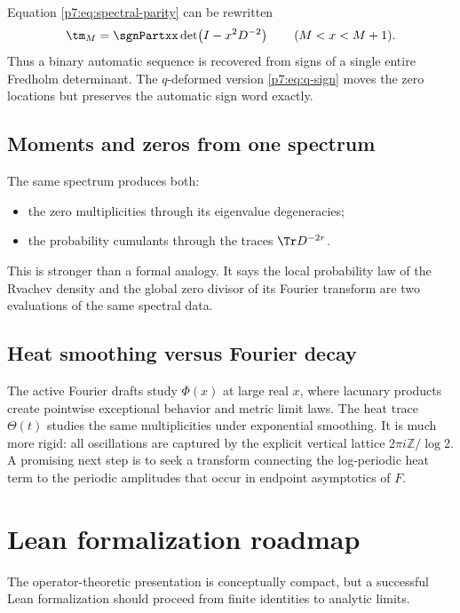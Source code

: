 \documentclass[11pt]{article}
\numberwithin{equation}{section}
\theoremstyle{definition}
\theoremstyle{remark}
\newcommand{\Z}{\mathbb Z}
\begin{document}
Equation \cref{p7:eq:spectral-parity} can be rewritten
\begin{equation}\label{p7:eq:tm-determinant-sign}
 \tm_M=\sgnPartxx\det\!\left(I-x^2D^{-2}\right)
 \qquad(M<x<M+1).
\end{equation}
Thus a binary automatic sequence is recovered from signs of a single entire Fredholm determinant.  The $q$-deformed version \cref{p7:eq:q-sign} moves the zero locations but preserves the automatic sign word exactly.

\subsection{Moments and zeros from one spectrum}

The same spectrum produces both:
\begin{itemize}[leftmargin=2em]
\item the zero multiplicities through its eigenvalue degeneracies;
\item the probability cumulants through the traces $\Tr D^{-2r}$.
\end{itemize}
This is stronger than a formal analogy.  It says the local probability law of the Rvachev density and the global zero divisor of its Fourier transform are two evaluations of the same spectral data.

\subsection{Heat smoothing versus Fourier decay}

The active Fourier drafts study $\Phi(x)$ at large real $x$, where lacunary products create pointwise exceptional behavior and metric limit laws.  The heat trace $\Theta(t)$ studies the same multiplicities under exponential smoothing.  It is much more rigid: all oscillations are captured by the explicit vertical lattice $2\pi i\Z/\log2$.  A promising next step is to seek a transform connecting the log-periodic heat term to the periodic amplitudes that occur in endpoint asymptotics of $F$.

\section{Lean formalization roadmap}

The operator-theoretic presentation is conceptually compact, but a successful Lean formalization should proceed from finite identities to analytic limits.
\end{document}
